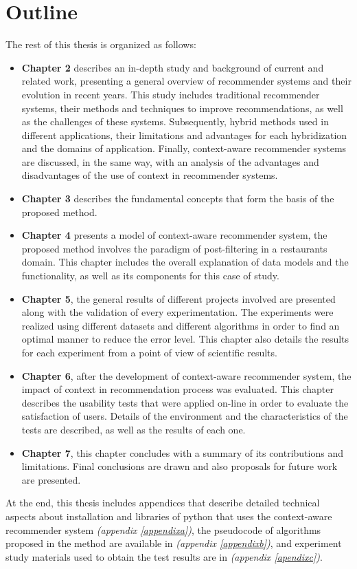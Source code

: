 \section{Outline}

The rest of this thesis is organized as follows: 
\begin{itemize}  
\item \textbf{Chapter 2} describes an in-depth study
and background of current and related work, presenting a general
overview of recommender systems and their evolution in recent years.
This study includes traditional recommender systems, their methods
and techniques to improve recommendations, as well as the challenges 
of these systems. Subsequently, hybrid methods used in different
applications, their limitations and advantages for each hybridization and
the domains of application. Finally, context-aware recommender systems
are discussed, in the same way,  with an analysis of the advantages and
disadvantages of the use of context in recommender systems.
\item \textbf{Chapter 3} describes the fundamental
concepts that form the basis of the proposed method.
\item \textbf{Chapter 4} presents a model of context-aware
recommender system, the proposed method involves the paradigm of
post-filtering in a restaurants domain. This chapter includes the
overall explanation of data models and  the functionality, as
well as its components for this case of study.
\item \textbf {Chapter 5}, the general results of different
projects involved are presented along with the validation of every
experimentation. The experiments were realized using different
datasets and different algorithms in order to find an optimal manner
to reduce the error level. This chapter also details the results for
each experiment from a point of view of scientific results.
\item \textbf {Chapter 6}, after the development of
context-aware recommender system, the impact of
context in recommendation process was evaluated. 
This chapter describes the
usability tests that were applied on-line in order to evaluate the
satisfaction of users. Details of the environment and the
characteristics of the tests are described, as well as 
the results of each one.
\item \textbf {Chapter 7}, this chapter concludes with a
summary of its contributions and limitations. Final
conclusions are drawn and also proposals for future work are presented.
\end{itemize}  
At the end, this thesis includes appendices that describe
detailed technical aspects about installation and libraries of python
that uses the context-aware recommender system  \textit{(appendix \ref{appendixa})}, 
the pseudocode of algorithms proposed in the method are available in  \textit{(appendix \ref{appendixb})}, 
and experiment study materials used to obtain the test results are in  \textit{(appendix \ref{apendixc})}.
